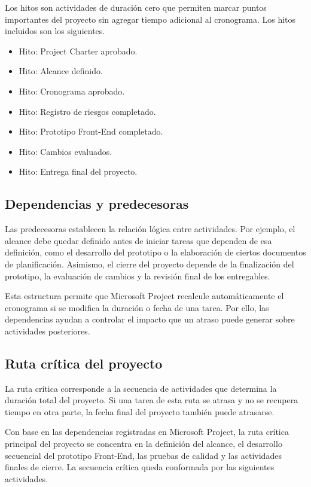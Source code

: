 \documentclass[11pt,spanish]{article}
\begin{document}
Los hitos son actividades de duración cero que permiten marcar puntos importantes del proyecto sin agregar tiempo adicional al cronograma. Los hitos incluidos son los siguientes.

\begin{itemize}[leftmargin=*, label={\textbullet}]
    \item Hito: Project Charter aprobado.
    \item Hito: Alcance definido.
    \item Hito: Cronograma aprobado.
    \item Hito: Registro de riesgos completado.
    \item Hito: Prototipo Front-End completado.
    \item Hito: Cambios evaluados.
    \item Hito: Entrega final del proyecto.
\end{itemize}

\subsection{Dependencias y predecesoras}

Las predecesoras establecen la relación lógica entre actividades. Por ejemplo, el alcance debe quedar definido antes de iniciar tareas que dependen de esa definición, como el desarrollo del prototipo o la elaboración de ciertos documentos de planificación. Asimismo, el cierre del proyecto depende de la finalización del prototipo, la evaluación de cambios y la revisión final de los entregables.

Esta estructura permite que Microsoft Project recalcule automáticamente el cronograma si se modifica la duración o fecha de una tarea. Por ello, las dependencias ayudan a controlar el impacto que un atraso puede generar sobre actividades posteriores.

\subsection{Ruta crítica del proyecto}

La ruta crítica corresponde a la secuencia de actividades que determina la duración total del proyecto. Si una tarea de esta ruta se atrasa y no se recupera tiempo en otra parte, la fecha final del proyecto también puede atrasarse.

Con base en las dependencias registradas en Microsoft Project, la ruta crítica principal del proyecto se concentra en la definición del alcance, el desarrollo secuencial del prototipo Front-End, las pruebas de calidad y las actividades finales de cierre. La secuencia crítica queda conformada por las siguientes actividades.
\end{document}
